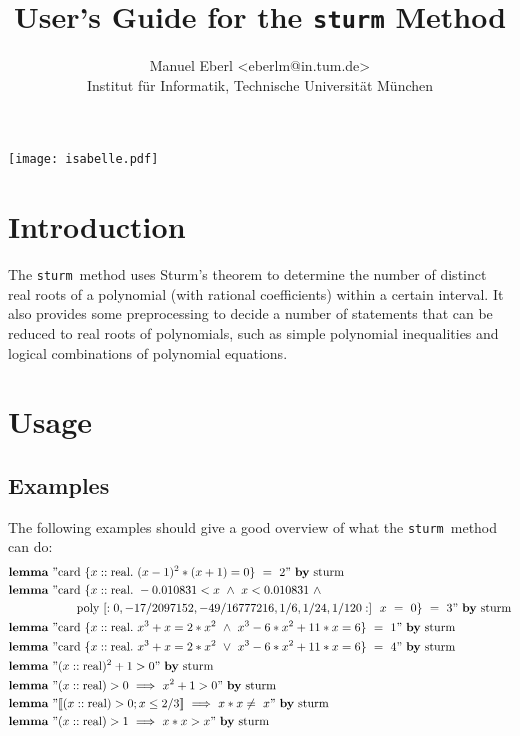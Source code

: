 \documentclass[11pt,a4paper,oneside]{article}
\title{\LARGE User's Guide for the \texttt{sturm} Method\\[4mm]}
\author{\Large Manuel Eberl <eberlm@in.tum.de>\\[1mm]\large Institut für Informatik, Technische Universität München\\[4mm]}
\newcommand{\sturm}{\texttt{sturm}}
\newcommand{\lemma}{\textbf{lemma}}
\newcommand{\card}{\textrm{card}}
\newcommand{\real}{\textrm{real}}
\begin{document}
\begin{center}
\vspace*{20mm}
\texttt{[image: isabelle.pdf]}
\end{center}
\vspace*{-5mm}
{\let\newpage\relax\maketitle}
\vspace*{10mm}
\tableofcontents
\newpage

\section{Introduction}

The \sturm\ method uses Sturm's theorem to determine the number of distinct real roots of a polynomial (with rational coefficients) within a certain interval. It also provides some preprocessing to decide a number of statements that can be reduced to real roots of polynomials, such as simple polynomial inequalities and logical combinations of polynomial equations.
\vspace*{10mm}

\section{Usage}

\subsection{Examples}
The following examples should give a good overview of what the \sturm\ method can do:
\begin{align*}
&\lemma\ "\card\ \{x::\real.\ (x - 1)^2 * (x + 1) = 0\}\  =\  2"\ \textrm{\textbf{by}\ sturm}\\
&\lemma\ "\mathrm{card}\ \{x::\mathrm{real}.\ -0.010831 < x\ \wedge\ x < 0.010831\ \wedge\\
&\hskip20mm \mathrm{poly}\ [:0, -17/2097152, -49/16777216, 1/6, 1/24, 1/120:]\ \ x\ =\ 0\}\  =\  3"\ \textrm{\textbf{by}\ sturm}\\
&\lemma\ "\card\ \{x::\real.\ x^3 + x = 2*x^2\ \wedge\ x^3-6*x^2+11*x=6\}\  =\  1"\ \textrm{\textbf{by}\ sturm}\\
&\lemma\ "\card\ \{x::\real.\ x^3 + x = 2*x^2\ \vee\ x^3-6*x^2+11*x=6\}\  =\  4"\ \textrm{\textbf{by}\ sturm}\\
&\lemma\ "(x::\real)^2+1 > 0"\ \textrm{\textbf{by}\ sturm}\\
&\lemma\ "(x::\real) > 0\ \Longrightarrow\ x^2+1 > 0"\ \textrm{\textbf{by}\ sturm}\\
&\lemma\ "\llbracket (x::\real) > 0; x \leq 2/3\rrbracket\ \Longrightarrow\ x*x \neq\ x"\ \textrm{\textbf{by}\ sturm}\\
&\lemma\ "(x::\real) > 1\ \Longrightarrow\ x*x > x"\ \textrm{\textbf{by}\ sturm}\\
\end{align*}
\end{document}
